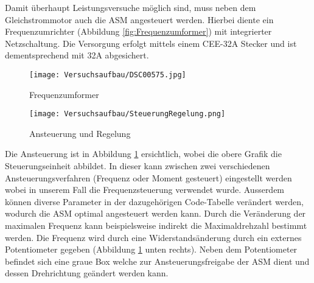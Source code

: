 Damit überhaupt Leistungsversuche möglich sind, muss neben dem Gleichstrommotor auch die ASM angesteuert werden. Hierbei diente ein Frequenzumrichter (Abbildung \ref{fig:Frequenzumformer}) mit integrierter Netzschaltung. Die Versorgung erfolgt mittels einem CEE-32A Stecker und ist dementsprechend mit 32A abgesichert.

\begin{figure}[H]
	\centering
	\begin{minipage}[h]{.4\linewidth} %
		\centering
		\texttt{[image: Versuchsaufbau/DSC00575.jpg]}
		\caption[Frequenzumformer]{Frequenzumformer}
		\label{fig:Frequenzumformer}
	\end{minipage}
	\quad %
	\begin{minipage}[h]{.4\linewidth} %
		\centering
		\texttt{[image: Versuchsaufbau/SteuerungRegelung.png]}
		\caption[Ansteuerung und Regelung]{Ansteuerung und Regelung}
		\label{fig:AnsteuerungRegelung}
	\end{minipage}
\end{figure}

 Die Ansteuerung ist in Abbildung \ref{fig:AnsteuerungRegelung} ersichtlich, wobei die obere Grafik die Steuerungseinheit abbildet. In dieser kann zwischen zwei verschiedenen Ansteuerungsverfahren (Frequenz oder Moment gesteuert) eingestellt werden wobei in unserem Fall die Frequenzsteuerung verwendet wurde. Ausserdem können diverse Parameter in der dazugehörigen Code-Tabelle verändert werden, wodurch die ASM optimal angesteuert werden kann. Durch die Veränderung der maximalen Frequenz kann beispielsweise indirekt die Maximaldrehzahl bestimmt werden. Die Frequenz wird durch eine Widerstandsänderung durch ein externes Potentiometer gegeben (Abbildung \ref{fig:AnsteuerungRegelung} unten rechts). Neben dem Potentiometer befindet sich eine graue Box welche zur Ansteuerungsfreigabe der ASM dient und dessen Drehrichtung geändert werden kann.
